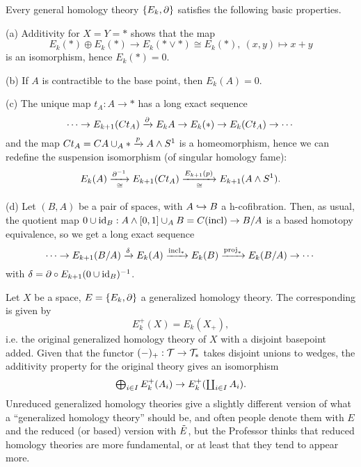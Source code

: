 \begin{remark}
Every general homology theory $\{E_k,\partial\}$ satisfies the following basic properties.
\begin{rmnumerate}
    \item[(a)] Additivity for $X=Y=*$ shows that the map
    \[E_k(*)\oplus E_k(*)\to E_k(*\vee *)\cong E_k(*),\ (x,y)\mapsto x+y\]
    is an isomorphism, hence $E_k(*)=0$.
    
    \item[(b)] If $A$ is contractible to the base point, then $E_k(A)=0$.
    
    \item[(c)] The unique map $t_A:A\to*$ has a long exact sequence
    \[\cdots\to E_{k+1}(Ct_A)\xrightarrow{\partial}E_k{A}\to E_k(*)\to E_k(Ct_A)\to\cdots\]
    and the map $Ct_A=CA\cup_A*\xrightarrow{p}A\wedge S^1$ is a homeomorphism, hence we can redefine the suspension isomorphism (of singular homology fame):
    \[E_k(A)\underset{\cong}{\xrightarrow{\partial^{-1}}}E_{k+1}(Ct_A)\underset{\cong}{\xrightarrow{E_{k+1}(p)}}E_{k+1}(A\wedge S^1).\]
    
    \item[(d)] Let $(B,A)$ be a pair of spaces, with $A\hookrightarrow B$ a h-cofibration. Then, as usual, the quotient map $0\cup\operatorname{id}_B:A\wedge[0,1]\cup_A B=C(\operatorname{incl})\to B/A$ is a based homotopy equivalence, so we get a long exact sequence
    \[\cdots\to E_{k+1}(B/A)\xrightarrow{\delta}E_k(A)\xrightarrow{\operatorname{incl}_*}E_k(B)\xrightarrow{\operatorname{proj}_*}E_k(B/A)\to\cdots\]
    with $\delta=\partial\circ E_{k+1}(0\cup\operatorname{id}_B)^{-1}$.
\end{rmnumerate}
\end{remark}

\begin{remark}
Let $X$ be a space, $E=\{E_k,\partial\}$ a generalized homology theory. The corresponding  is given by
\[E^+_k(X)=E_k(X_+),\]
i.e. the original generalized homology theory of $X$ with a disjoint basepoint added. Given that the functor $(-)_+:\mathcal{T}\to\mathcal{T}_*$ takes disjoint unions to wedges, the additivity property for the original theory gives an isomorphism
\[\textstyle\bigoplus_{i\in I}E^+_k(A_i)\to E^+_k(\textstyle\coprod_{i\in I}A_i).\]
Unreduced generalized homology theories give a slightly different version of what a \enquote{generalized homology theory} should be, and often people denote them with $E$ and the reduced (or based) version with $\tilde E$, but the Professor thinks that reduced homology theories are more fundamental, or at least that they tend to appear more.
\end{remark}

